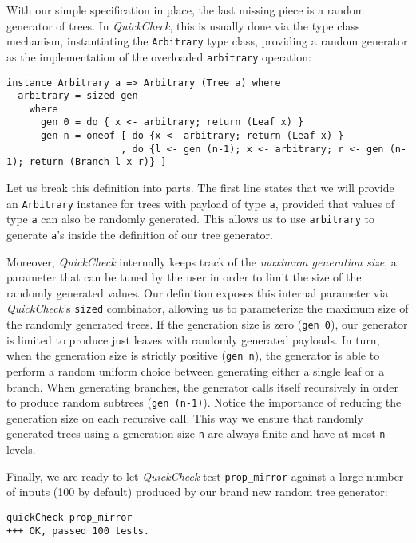 \documentclass[acmsmall, anonymous]{acmart}
\newcommand{\quickcheck}{\textit{QuickCheck}\xspace}
\begin{document}
With our simple specification in place, the last missing piece is a random
generator of trees.
%
In \quickcheck, this is usually done via the type class mechanism, instantiating
the \texttt{Arbitrary} type class, providing a random generator as the
implementation of the overloaded \texttt{arbitrary} operation:

\begin{verbatim}
instance Arbitrary a => Arbitrary (Tree a) where
  arbitrary = sized gen
    where
      gen 0 = do { x <- arbitrary; return (Leaf x) }
      gen n = oneof [ do {x <- arbitrary; return (Leaf x) }
                    , do {l <- gen (n-1); x <- arbitrary; r <- gen (n-1); return (Branch l x r)} ]
\end{verbatim}

\noindent Let us break this definition into parts.
%
The first line states that we will provide an \texttt{Arbitrary} instance for
trees with payload of type \texttt{a}, provided that values of type \texttt{a}
can also be randomly generated.
%
This allows us to use \texttt{arbitrary} to generate \texttt{a}'s inside the
definition of our tree generator.


Moreover, \quickcheck internally keeps track of the \emph{maximum generation
  size}, a parameter that can be tuned by the user in order to limit the size of
the randomly generated values.
%
Our definition exposes this internal parameter via \quickcheck's \texttt{sized}
combinator, allowing us to parameterize the maximum size of the randomly
generated trees.
%
If the generation size is zero (\texttt{gen 0}), our generator is limited to
produce just leaves with randomly generated payloads.
%
In turn, when the generation size is strictly positive (\texttt{gen n}), the
generator is able to perform a random uniform choice between generating either a
single leaf or a branch.
%
When generating branches, the generator calls itself recursively in order to
produce random subtrees (\texttt{gen (n-1)}).
%
Notice the importance of reducing the generation size on each recursive call.
%
This way we ensure that randomly generated trees using a generation size
\texttt{n} are always finite and have at most \texttt{n} levels.

Finally, we are ready to let \quickcheck test \texttt{prop\_mirror} against a
large number of inputs (100 by default) produced by our brand new random tree
generator:

\begin{verbatim}
quickCheck prop_mirror
+++ OK, passed 100 tests.
\end{verbatim}
\end{document}
